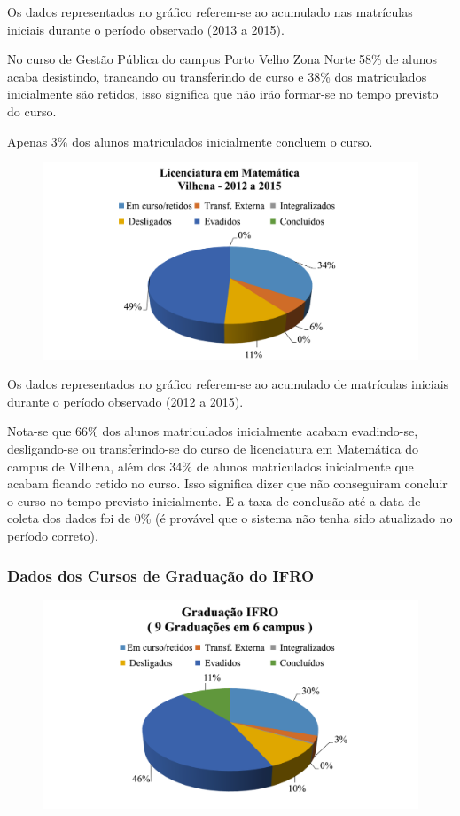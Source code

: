 \documentclass[article,12pt,onesidea,4paper,english,brazil]{abntex2}
\begin{document}
	Os dados representados no gráfico referem-se ao acumulado nas matrículas iniciais durante o
	período observado (2013 a 2015).
	
	No curso de Gestão Pública do campus Porto Velho Zona Norte 58\% de alunos acaba
	desistindo, trancando ou transferindo de curso e 38\% dos matriculados inicialmente são retidos,
	isso significa que não irão formar-se no tempo previsto do curso.
	
	Apenas 3\% dos alunos matriculados inicialmente concluem o curso.
	
	\begin{figure}[ht]
		\centering
		\includegraphics[width=0.8\linewidth]{pip-97-14}
	\end{figure}
	
	Os dados representados no gráfico referem-se ao acumulado de matrículas iniciais durante
	o período observado (2012 a 2015).
	
	Nota-se que 66\% dos alunos matriculados inicialmente acabam evadindo-se, desligando-se
	ou transferindo-se do curso de licenciatura em Matemática do campus de Vilhena, além dos 34\%
	de alunos matriculados inicialmente que acabam ficando retido no curso. Isso significa dizer que
	não conseguiram concluir o curso no tempo previsto inicialmente. E a taxa de conclusão até a data
	de coleta dos dados foi de 0\% (é provável que o sistema não tenha sido atualizado no período
	correto).
	
	\subsubsection*{Dados dos Cursos de Graduação do IFRO}
	
	\begin{figure}[ht]
		\centering
		\includegraphics[width=0.8\linewidth]{pip-97-15}
	\end{figure}
	
\end{document}

